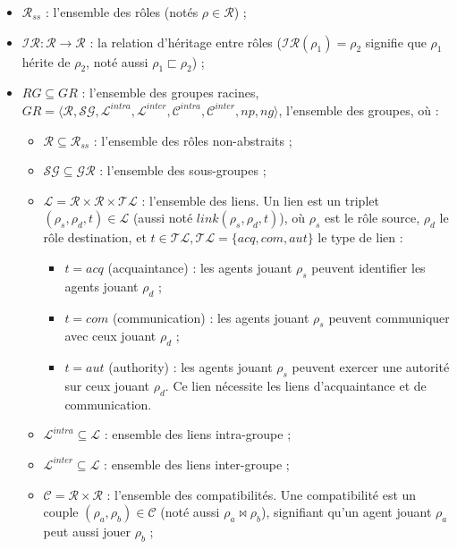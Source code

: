 \begin{itemize}
    \item $\mathcal{R}_{ss}$ : l'ensemble des rôles (notés $\rho \in \mathcal{R}$) ;
    \item $\mathcal{IR}: \mathcal{R} \rightarrow \mathcal{R}$ : la relation d'héritage entre rôles ($\mathcal{IR}(\rho_1) = \rho_2$ signifie que $\rho_1$ hérite de $\rho_2$, noté aussi $\rho_1 \sqsubset \rho_2$) ;
    \item $RG \subseteq GR$ : l'ensemble des groupes racines, $GR = \langle \mathcal{R}, \mathcal{SG}, \mathcal{L}^{intra}, \mathcal{L}^{inter}, \mathcal{C}^{intra}, \mathcal{C}^{inter}, np, ng \rangle$, l'ensemble des groupes, où :
    \begin{itemize}
        \item $\mathcal{R} \subseteq \mathcal{R}_{ss}$ : l'ensemble des rôles non-abstraits ;
        \item $\mathcal{SG} \subseteq \mathcal{GR}$ : l'ensemble des sous-groupes ;
        \item $\mathcal{L} = \mathcal{R} \times \mathcal{R} \times \mathcal{TL}$ : l'ensemble des liens. Un lien est un triplet $(\rho_s,\rho_d,t) \in \mathcal{L}$ (aussi noté $link(\rho_s,\rho_d,t)$), où $\rho_s$ est le rôle source, $\rho_d$ le rôle destination, et $t \in \mathcal{TL}, \mathcal{TL} = \{acq, com, aut\}$ le type de lien :
        \begin{itemize}
            \item $t = acq$ (acquaintance) : les agents jouant $\rho_s$ peuvent identifier les agents jouant $\rho_d$ ;
            \item $t = com$ (communication) : les agents jouant $\rho_s$ peuvent communiquer avec ceux jouant $\rho_d$ ;
            \item $t = aut$ (authority) : les agents jouant $\rho_s$ peuvent exercer une autorité sur ceux jouant $\rho_d$. Ce lien nécessite les liens d'acquaintance et de communication.
        \end{itemize}
        \item $\mathcal{L}^{intra} \subseteq \mathcal{L}$ : ensemble des liens intra-groupe ;
        \item $\mathcal{L}^{inter} \subseteq \mathcal{L}$ : ensemble des liens inter-groupe ;
        \item $\mathcal{C} = \mathcal{R} \times \mathcal{R}$ : l'ensemble des compatibilités. Une compatibilité est un couple $(\rho_a, \rho_b) \in \mathcal{C}$ (noté aussi $\rho_a \bowtie \rho_b$), signifiant qu'un agent jouant $\rho_a$ peut aussi jouer $\rho_b$ ;

\end{itemize}
\end{itemize}
